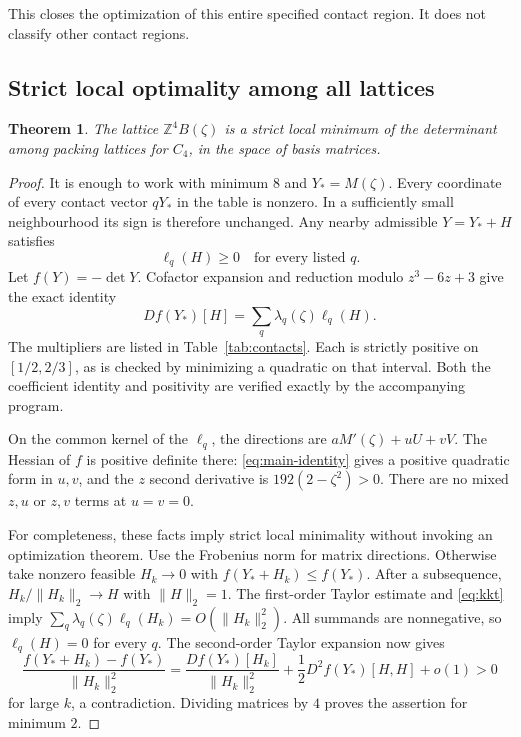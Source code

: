\documentclass[11pt,reqno]{amsart}
\newtheorem{theorem}{Theorem}[section]
\theoremstyle{definition}
\newcommand{\Z}{\mathbb Z}
\begin{document}
This closes the optimization of this entire specified contact region.
It does not classify other contact regions.

\subsection{Strict local optimality among all lattices}
\begin{theorem}\label{thm:local}
The lattice $\Z^4B(\zeta)$ is a strict local minimum of the determinant
among packing lattices for $C_4$, in the space of basis matrices.
\end{theorem}
\begin{proof}
It is enough to work with minimum $8$ and $Y_*=M(\zeta)$. Every coordinate
of every contact vector $qY_*$ in the table is nonzero. In a sufficiently
small neighbourhood its sign is therefore unchanged. Any nearby
admissible $Y=Y_*+H$ satisfies
\[
 \ell_q(H)\ge0\quad\text{for every listed }q.
\]
Let $f(Y)=-\det Y$. Cofactor expansion and reduction modulo
$z^3-6z+3$ give the exact identity
\begin{equation}\label{eq:kkt}
 Df(Y_*)[H]=\sum_q\lambda_q(\zeta)\ell_q(H).
\end{equation}
The multipliers are listed in Table~\ref{tab:contacts}. Each is strictly
positive on $[1/2,2/3]$, as is checked by minimizing a quadratic on that
interval. Both the coefficient identity and positivity are verified
exactly by the accompanying program.

On the common kernel of the $\ell_q$, the directions are
$aM'(\zeta)+uU+vV$. The Hessian of $f$ is positive definite there:
\eqref{eq:main-identity} gives a positive quadratic form in $u,v$, and
the $z$ second derivative is $192(2-\zeta^2)>0$. There are no mixed
$z,u$ or $z,v$ terms at $u=v=0$.

For completeness, these facts imply strict local minimality without
invoking an optimization theorem. Use the Frobenius norm for matrix
directions. Otherwise take nonzero feasible
$H_k\to0$ with $f(Y_*+H_k)\le f(Y_*)$. After a subsequence,
$H_k/\|H_k\|_2\to H$ with $\|H\|_2=1$.
The first-order Taylor estimate and \eqref{eq:kkt} imply
$\sum_q\lambda_q(\zeta)\ell_q(H_k)=O(\|H_k\|_2^2)$.
All summands are nonnegative, so $\ell_q(H)=0$ for every $q$.
The second-order Taylor expansion now gives
\[
 \frac{f(Y_*+H_k)-f(Y_*)}{\|H_k\|_2^2}
 =\frac{Df(Y_*)[H_k]}{\|H_k\|_2^2}
   +\frac12D^2f(Y_*)[H,H]+o(1)>0
\]
for large $k$, a contradiction. Dividing matrices by $4$ proves the
assertion for minimum $2$.
\end{proof}
\end{document}
